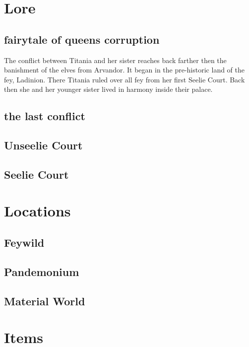 \documentclass[letter,10pt,twocolumn,openany]{dndbook}
\begin{document}
\chapter{Lore}

\section{fairytale of queens corruption}

The conflict between Titania and her sister reaches back farther then the banishment of the elves from Arvandor.
It began in the pre-historic land of the fey, Ladinion.
There Titania ruled over all fey from her first Seelie Court.
Back then she and her younger sister lived in harmony inside their palace.


\section{the last conflict}

\section{Unseelie Court}

\section{Seelie Court}


\chapter{Locations}

\section{Feywild}
\section{Pandemonium}
\section{Material World}

\chapter{Items}

\end{document}
